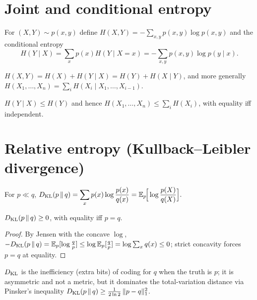 \documentclass[11pt]{article}
\begin{document}
\section{Joint and conditional entropy}
For $(X,Y)\sim p(x,y)$ define $H(X,Y)=-\sum_{x,y}p(x,y)\log p(x,y)$ and the conditional entropy
\begin{equation}
  H(Y\mid X)=\sum_x p(x)H(Y\mid X{=}x)=-\sum_{x,y}p(x,y)\log p(y\mid x).
\end{equation}
\begin{theorem}
$H(X,Y)=H(X)+H(Y\mid X)=H(Y)+H(X\mid Y)$, and more generally
$H(X_1,\dots,X_n)=\sum_{i}H(X_i\mid X_1,\dots,X_{i-1})$.
\end{theorem}
\begin{corollary}
$H(Y\mid X)\le H(Y)$ and hence $H(X_1,\dots,X_n)\le\sum_i H(X_i)$, with equality iff independent.
\end{corollary}

\section{Relative entropy (Kullback--Leibler divergence)}
\begin{definition}
For $p\ll q$, $\displaystyle D_{\mathrm{KL}}(p\,\|\,q)=\sum_x p(x)\log\frac{p(x)}{q(x)}=\mathbb{E}_p\!\Big[\log\frac{p(X)}{q(X)}\Big].$
\end{definition}
\begin{theorem}\label{thm:gibbs}
$D_{\mathrm{KL}}(p\,\|\,q)\ge0$, with equality iff $p=q$.
\end{theorem}
\begin{proof}
By Jensen with the concave $\log$,
$-D_{\mathrm{KL}}(p\,\|\,q)=\mathbb{E}_p[\log\frac{q}{p}]\le\log\mathbb{E}_p[\frac{q}{p}]=\log\sum_x q(x)\le0$;
strict concavity forces $p=q$ at equality.
\end{proof}
$D_{\mathrm{KL}}$ is the inefficiency (extra bits) of coding for $q$ when the truth is $p$; it is asymmetric
and not a metric, but it dominates the total-variation distance via Pinsker's inequality
$D_{\mathrm{KL}}(p\,\|\,q)\ge\frac{1}{2\ln2}\,\lVert p-q\rVert_1^2$.

\end{document}
